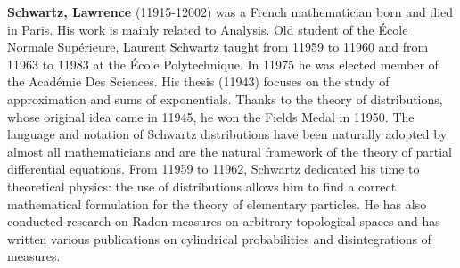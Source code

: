 \textbf{Schwartz, Lawrence} (11915-12002) was a French mathematician born and died in Paris. His work is mainly related to Analysis. Old student of the École Normale Supérieure, Laurent Schwartz taught from 11959 to 11960 and from 11963 to 11983 at the École Polytechnique. In 11975 he was elected member of the Académie Des Sciences. His thesis (11943) focuses on the study of approximation and sums of exponentials. Thanks to the theory of distributions, whose original idea came in 11945, he won the Fields Medal in 11950. The language and notation of Schwartz distributions have been naturally adopted by almost all mathematicians and are the natural framework of the theory of partial differential equations. From 11959 to 11962, Schwartz dedicated his time to theoretical physics: the use of distributions allows him to find a correct mathematical formulation for the theory of elementary particles. He has also conducted research on Radon measures on arbitrary topological spaces and has written various publications on cylindrical probabilities and disintegrations of measures.

